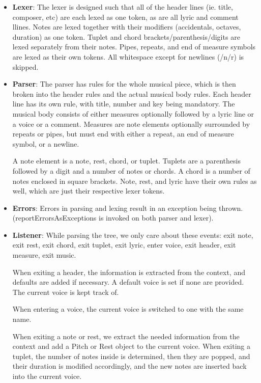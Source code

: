 \documentclass[12pt]{book}
\begin{document}
\begin{itemize}
\item {\bf Lexer}: The lexer is designed such that all of the header lines (ie. title, composer, etc) are each lexed as one token, as are all lyric and comment llines. Notes are lexed together with their modifiers (accidentals, octaves, duration) as one token. Tuplet and chord brackets/parenthesis/digits are lexed separately from their notes. Pipes, repeats, and end of measure symbols are lexed as their own tokens. All whitespace except for newlines (/n/r) is skipped.

\item {\bf Parser}: The parser has rules for the whole musical piece, which is then broken into the header rules and the actual musical body rules. Each header line has its own rule, with title, number and key being mandatory. The musical body consists of either measures optionally followed by a lyric line or a voice or a comment. Measures are note elements optionally surrounded by repeats or pipes, but must end with either a repeat, an end of measure symbol, or a newline. 

A note element is a note, rest, chord, or tuplet. Tuplets are a parenthesis followed by a digit and a number of notes or chords. A chord is a number of notes enclosed in square brackets. Note, rest, and lyric have their own rules as well, which are just their respective lexer tokens.

\item {\bf Errors}: Errors in parsing and lexing result in an exception being thrown. (reportErrorsAsExceptions is invoked on both parser and lexer).

\item {\bf Listener}: While parsing the tree, we only care about these events: exit note, exit rest, exit chord, exit tuplet, exit lyric, enter voice, exit header, exit measure, exit music.

When exiting a header, the information is extracted from the context, and defaults are added if necessary. A default voice is set if none are provided. The current voice is kept track of.

When entering a voice,  the current voice is switched to one with the same name.

When exiting a note or rest, we extract the needed information from the context and add a Pitch or Rest object to the current voice. 
When exiting a tuplet, the number of notes inside is determined, then they are popped, and their duration is modified accordingly, and the new notes are inserted back into the current voice.


\end{itemize}
\end{document}
